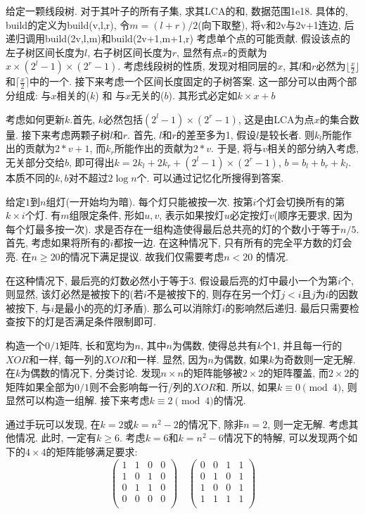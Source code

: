 \prob 给定一颗线段树. 对于其叶子的所有子集, 求其LCA的和, 数据范围1e18. 具体的, build的定义为build(v,l,r), 令$m = (l+r)/2$(向下取整), 将v和2v与2v+1连边, 后递归调用build(2v,l,m)和build(2v+1,m+1,r)
\sol  考虑单个点的可能贡献. 假设该点的左子树区间长度为$l$, 右子树区间长度为$r$, 显然有点$x$的贡献为$x \times (2^l - 1) \times (2^r - 1)$. 考虑线段树的性质, 发现对相同层的$x$, 其$l$和$r$必然为$\lfloor{\frac{x}{2}}\rfloor$和$\lceil{\frac{x}{2}}\rceil$中的一个. 接下来考虑一个区间长度固定的子树答案. 这一部分可以由两个部分组成: 与$x$相关的($k$) 和 与$x$无关的($b$). 其形式必定如$k\times x + b$

考虑如何更新$k$.首先, $k$必然包括$(2^l-1) \times (2^r - 1)$, 这是由LCA为点$x$的集合数量. 接下来考虑两颗子树$l$和$r$. 首先, $l$和$r$的差至多为1, 假设$l$是较长者. 则$k_l$所能作出的贡献为$2 * v + 1$, 而$k_r$所能作出的贡献为$2 * v$. 于是, 将与$v$相关的部分纳入考虑, 无关部分交给$b$, 即可得出$k = 2k_l + 2k_r + (2^{l}-1) \times (2^{r} - 1)$, $b = b_l + b_r + k_l$. 本质不同的$k,b$对不超过$2\log{n}$个. 可以通过记忆化所搜得到答案.

\prob 给定$1$到$n$组灯(一开始均为暗). 每个灯只能被按一次. 按第$i$个灯会切换所有的第$k \times i$个灯. 有$m$组限定条件, 形如$u, v$, 表示如果按灯$u$必定按灯$v$(顺序无要求, 因为每个灯最多按一次). 求是否存在一组构造使得最后总共亮的灯的个数小于等于$n / 5$.
\sol 首先, 考虑如果将所有的$i$都按一边. 在这种情况下, 只有所有的完全平方数的灯会亮. 在$n \geq 20$的情况下满足提议. 故我们仅需要考虑$n < 20$ 的情况.

在这种情况下, 最后亮的灯数必然小于等于$3$. 假设最后亮的灯中最小一个为第$i$个, 则显然, 该灯必然是被按下的(若$i$不是被按下的, 则存在另一个灯$j < i$且$j$为$i$的因数被按下, 与$i$是最小的亮的灯矛盾). 那么可以消除灯$i$的影响然后递归. 最后只需要检查按下的灯是否满足条件限制即可.

\prob 构造一个$0/1$矩阵, 长和宽均为$n$, 其中$n$为偶数, 使得总共有$k$个1, 并且每一行的$XOR$和一样, 每一列的$XOR$和一样.
\sol 显然, 因为$n$为偶数, 如果$k$为奇数则一定无解. 在$k$为偶数的情况下, 分类讨论. 发现$n\times n$的矩阵能够被$2 \times 2$的矩阵覆盖, 而$2 \times 2$的矩阵如果全部为$0/1$则不会影响每一行/列的$XOR$和. 所以, 如果$k \equiv 0 \pmod{4}$, 则显然可以构造一组解. 接下来考虑$k \equiv 2 \pmod{4}$的情况.

通过手玩可以发现, 在$k = 2$或$k = n^2 - 2$的情况下, 除非$n=2$, 则一定无解. 考虑其他情况. 此时, 一定有$k \geq 6$. 考虑$k = 6$和$k = n^2 - 6$情况下的特解, 可以发现两个如下的$4 \times 4$的矩阵能够满足要求:
$$
\begin{pmatrix}
1 & 1 & 0 & 0 \\
1 & 0 & 1 & 0 \\
0 & 1 & 1 & 0 \\
0 & 0 & 0 & 0 \\
\end{pmatrix}
\quad
\begin{pmatrix}
0 & 0 & 1 & 1 \\
0 & 1 & 0 & 1 \\
1 & 0 & 0 & 1 \\
1 & 1 & 1 & 1 \\
\end{pmatrix}
$$

